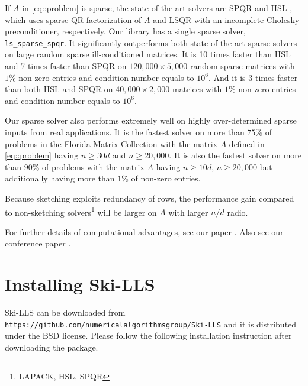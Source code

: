 \documentclass[english,11pt]{article}
\begin{document}
If $A$ in \eqref{eq::problem} is sparse, the state-of-the-art solvers are SPQR \cite{Davis:2011ft} and HSL \cite{Scott:2014iq}, which uses sparse QR factorization of $A$ and LSQR with an incomplete Cholesky preconditioner, respectively. Our library has a single sparse solver, {\tt ls_sparse_spqr}. It significantly outperforms both state-of-the-art sparse solvers on large random sparse ill-conditioned matrices. It is 10 times faster than HSL and 7 times faster than SPQR on $120,000 \times 5,000$ random sparse matrices with $1\%$ non-zero entries and condition number equals to $10^6$. And it is 3 times faster than both HSL and SPQR on $40,000 \times 2,000$ matrices with $1\%$ non-zero entries and condition number equals to $10^6$.

Our sparse solver also performs extremely well on highly over-determined sparse inputs from real applications. It is the fastest solver on more than $75 \%$ of problems in the Florida Matrix Collection \cite{Davis_2011} with the matrix $A$ defined in \eqref{eq::problem} having $n\geq 30d$ and $n \geq 20,000$. It is also the fastest solver on more than $90\%$ of problems with the matrix $A$ having $n\geq 10d$, $n \geq 20,000$ but additionally having more than $1\%$ of non-zero entries. 

Because sketching exploits redundancy of rows, the performance gain compared to non-sketching solvers\footnote{LAPACK, HSL, SPQR} will be larger on $A$ with larger $n/d$ radio.

For further details of computational advantages, see our paper \cite{Zhen:OpOnline}. Also see our conference paper \cite{Zhen:ICML}.

\section{Installing Ski-LLS}
Ski-LLS can be downloaded from {\tt https://github.com/numericalalgorithmsgroup/Ski-LLS} and it is distributed under the BSD license. Please follow the following installation instruction after downloading the package. 
\end{document}
